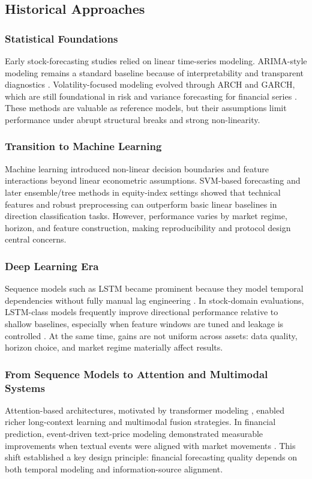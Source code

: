 \documentclass[12pt,a4paper]{article}
\begin{document}
\subsection{Historical Approaches}

\subsubsection{Statistical Foundations}
Early stock-forecasting studies relied on linear time-series modeling. ARIMA-style modeling remains a standard baseline because of interpretability and transparent diagnostics \cite{box2015}. Volatility-focused modeling evolved through ARCH and GARCH, which are still foundational in risk and variance forecasting for financial series \cite{engle1982,bollerslev1986}. These methods are valuable as reference models, but their assumptions limit performance under abrupt structural breaks and strong non-linearity.

\subsubsection{Transition to Machine Learning}
Machine learning introduced non-linear decision boundaries and feature interactions beyond linear econometric assumptions. SVM-based forecasting \cite{kim2003} and later ensemble/tree methods in equity-index settings \cite{patel2015,nti2020review} showed that technical features and robust preprocessing can outperform basic linear baselines in direction classification tasks. However, performance varies by market regime, horizon, and feature construction, making reproducibility and protocol design central concerns.

\subsubsection{Deep Learning Era}
Sequence models such as LSTM became prominent because they model temporal dependencies without fully manual lag engineering \cite{hochreiter1997}. In stock-domain evaluations, LSTM-class models frequently improve directional performance relative to shallow baselines, especially when feature windows are tuned and leakage is controlled \cite{fischer2018,sezer2020}. At the same time, gains are not uniform across assets: data quality, horizon choice, and market regime materially affect results.

\subsubsection{From Sequence Models to Attention and Multimodal Systems}
Attention-based architectures, motivated by transformer modeling \cite{vaswani2017}, enabled richer long-context learning and multimodal fusion strategies. In financial prediction, event-driven text-price modeling demonstrated measurable improvements when textual events were aligned with market movements \cite{ding2015}. This shift established a key design principle: financial forecasting quality depends on both temporal modeling and information-source alignment.
\end{document}
